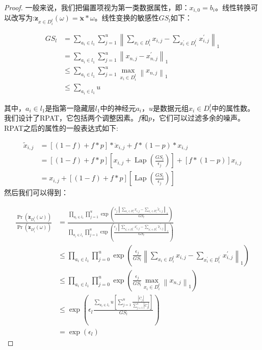 \begin{proof}
一般来说，我们把偏置项视为第一类数据属性，即：$x_{i, 0}=b_{i}$。线性转换可以改写为:$\ddot{\mathbf{z}}_{x \in D_{i}^{t}}(\omega)=\ddot{\mathbf{x}} * \omega$。线性变换的敏感性$G S_{l}$如下：

$$\begin{aligned} G S_{l} &=\sum_{a_{i} \in l_{1}} \sum_{j=1}^{u}\left\|\sum_{x_{i} \in D_{i}^{t}} x_{i, j}-\sum_{x_{i}^{\prime} \in D_{i}^{t^{\prime}}} x_{i, j}^{\prime}\right\|_{1} \\ &=\sum_{a_{i} \in l_{1}} \sum_{j=1}^{u}\left\|x_{n, j}-x_{n, j}^{\prime}\right\|_{1} \\ & \leq \sum_{a_{i} \in l_{1}} \sum_{j=1}^{u} \max _{x_{i} \in D_{i}^{t}}\left\|x_{n, j}\right\|_{1} \\ & \leq \sum_{a_{i} \in l_{1}} u \end{aligned}$$

其中，$a_{i} \in l_{1}$是指第一隐藏层$l_{1}$中的神经元$a_{i}$，$u$是数据元组$x_{i} \in D_{i}^{t}$中的属性数。
我们设计了RPAT，它包括两个调整因素。$f$和$p$，它们可以过滤多余的噪声。RPAT之后的属性的一般表达式如下:

$$
\begin{aligned}
\tilde{x}_{i, j} &=[(1-f)+f * p] * \ddot{x}_{i, j}+f *(1-p) * x_{i, j} \\
&=[(1-f)+f * p]\left[x_{i, j}+\operatorname{Lap}\left(\frac{G S_{l}}{\epsilon_{j}}\right)\right]+[f *(1-p)] x_{i, j} \\
&=x_{i, j}+[(1-f)+f * p]\left[\operatorname{Lap}\left(\frac{G S_{l}}{\epsilon_{j}}\right)\right]
\end{aligned}
$$
然后我们可以得到：

$$
\begin{aligned}
\frac{\operatorname{Pr}\left(\ddot{\mathbf{z}}_{D_{i}^{t}}(\omega)\right)}{\operatorname{Pr}\left(\ddot{\mathbf{z}}_{D_{i}^{t}}(\omega)\right)} &=\frac{\prod_{a_{i} \in l_{1}} \prod_{j=1}^{u} \exp \left(\frac{\epsilon_{j}\left\|\sum_{x_{i} \in D_{i}^{t}} x_{i, j}-\sum_{x_{i} \in D_{i}^{t}} \tilde{x}_{i, j}\right\|_{1}}{G S_{l}}\right)}{\prod_{a_{i} \in l_{1}} \prod_{j=1}^{u} \exp \left(\frac{\epsilon_{j}\left\|\sum_{x_{i}^{\prime} \in D_{i}^{t^{\prime}}} x_{i, j}^{\prime}-\sum_{x_{i}^{\prime} \in D_{i}^{t^{\prime}}} \tilde{x}_{i, j}^{\prime}\right\|_{1}}{G S_{l}}\right)} \\
& \leq \prod_{a_{i} \in l_{1}} \prod_{j=0}^{u} \exp \left(\frac{\epsilon_{j}}{G S_{l}}\left\|\sum_{x_{i} \in D_{i}^{t}} x_{i, j}-\sum_{x_{i}^{\prime} \in D_{i}^{t^{\prime}}} x_{i, j}^{\prime}\right\|_{1}\right) \\
& \leq \prod_{a_{i} \in l_{1}} \prod_{j=0}^{u} \exp \left(\frac{\epsilon_{j}}{G S_{l}} \max _{x_{i} \in D_{i}^{t}}\left\|x_{n, j}\right\|_{1}\right) \\
& \leq \exp \left(\epsilon_{l} \frac{\sum_{a_{i} \in l_{1}} u\left[\sum_{j=1}^{u} \frac{\left|\ddot{C}_{j}\right|}{\sum_{j=1}^{u}\left|\ddot{C}_{j}\right|}\right]}{G S_{l}}\right) \\
&=\exp \left(\epsilon_{l}\right)
\end{aligned}
$$
\end{proof}

